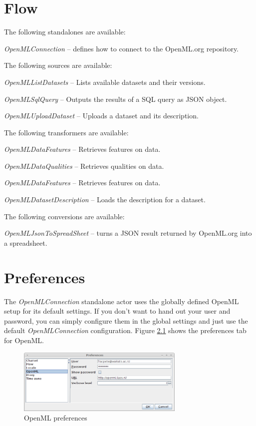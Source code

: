 \documentclass[a4paper]{book}
\begin{document}
\chapter{Flow}
The following standalones are available:
\begin{tight_itemize}
	\item \textit{OpenMLConnection} -- defines how to connect to the OpenML.org repository.
\end{tight_itemize}
The following sources are available:
\begin{tight_itemize}
	\item \textit{OpenMLListDatasets} -- Lists available datasets and their versions.
	\item \textit{OpenMLSqlQuery} -- Outputs the results of a SQL query as JSON object.
	\item \textit{OpenMLUploadDataset} -- Uploads a dataset and its description.
\end{tight_itemize}
The following transformers are available:
\begin{tight_itemize}
	\item \textit{OpenMLDataFeatures} -- Retrieves features on data.
	\item \textit{OpenMLDataQualities} -- Retrieves qualities on data.
	\item \textit{OpenMLDataFeatures} -- Retrieves features on data.
	\item \textit{OpenMLDatasetDescription} -- Loads the description for a dataset.
\end{tight_itemize}
The following conversions are available:
\begin{tight_itemize}
	\item \textit{OpenMLJsonToSpreadSheet} -- turns a JSON result returned by OpenML.org 
	into a spreadsheet.
\end{tight_itemize}

\chapter{Preferences}
\label{preferences}
The \textit{OpenMLConnection} standalone actor uses the globally defined
OpenML setup for its default settings. If you don't want to hand out your
user and password, you can simply configure them in the global
settings and just use the default \textit{OpenMLConnection} configuration.
Figure \ref{openml_preferences} shows the preferences tab for OpenML.
\begin{figure}[htb]
  \centering
  \includegraphics[width=8.0cm]{images/openml_preferences.png}
  \caption{OpenML preferences}
  \label{openml_preferences}
\end{figure}


\end{document}
